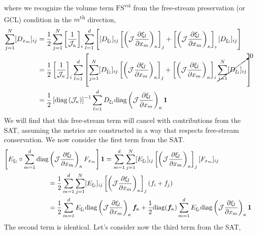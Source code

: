 \documentclass[12pt,a4paper]{article}
\newcommand{\pder}[2][]{\dfrac{\partial #1}{\partial #2}} %
\newcommand{\up}{\textsuperscript} %
\newcommand{\fn}[1]{\mathcal{#1}} %
\begin{document}
where we recognize the volume term $\text{FS}^{\text{vol}}$ from the free-stream preservation (or GCL) condition in the $m$\up{th} direction,
\begin{align*}
\sum_{j=1}^N [D_{x_m}]_{ij} &= \frac{1}{2} \sum_{j=1}^N \left[ \frac{1}{\fn{J}_\kappa} \right]_i \sum_{l=1}^d \left[ [D_{\xi_l}]_{ij} \left[ \left( \fn{J} \pder[\xi_l]{x_m} \right)_\kappa \right]_j + \left[ \left( \fn{J} \pder[\xi_l]{x_m} \right)_\kappa \right]_i  [ D_{\xi_l} ]_{ij} \right] \\
&= \frac{1}{2} \left[ \frac{1}{\fn{J}_\kappa} \right]_i \sum_{l=1}^d \left[ \sum_{j=1}^N [D_{\xi_l}]_{ij} \left[ \left( \fn{J} \pder[\xi_l]{x_m} \right)_\kappa \right]_j + \left[ \left( \fn{J} \pder[\xi_l]{x_m} \right)_\kappa \right]_i \cancelto{0}{\sum_{j=1}^N [ D_{\xi_l} ]_{ij}} \right] \\
&= \frac{1}{2}  \left[ \text{diag}\left( \fn{J}_\kappa \right) \right]^{-1} \sum_{l=1}^d  D_{\xi_l} \text{diag} \left( \fn{J} \pder[\xi_l]{x_m} \right)_\kappa \bm{1} 
\end{align*}
We will find that this free-stream term will cancel with contributions from the SAT, assuming the metrics are constructed in a way that respects free-stream conservation. We now consider the first term from the SAT.
\begin{align*}
\left[ E_{\xi_l} \circ \sum_{m=1}^d \text{diag}  \left( \fn{J} \pder[\xi_l]{x_m} \right)_{\kappa} F_{x_m}  \right] \bm{1} & = \sum_{m=1}^d \sum_{j=1}^N [E_{\xi_l}]_{ij} \left[ \left( \fn{J} \pder[\xi_l]{x_m} \right)_{\kappa} \right]_{j} [ F_{x_m} ]_{ij} \\
& \hspace{-3cm} = \frac{1}{2} \sum_{m=1}^d \sum_{j=1}^N [E_{\xi_l}]_{ij} \left[ \left( \fn{J} \pder[\xi_l]{x_m} \right)_{\kappa} \right]_{j} (f_i + f_j) \\
& \hspace{-3cm} = \frac{1}{2} \sum_{m=1}^d E_{\xi_l} \text{diag}  \left( \fn{J} \pder[\xi_l]{x_m} \right)_{\kappa} \bm{f}_\kappa + \frac{1}{2} \text{diag} (\bm{f}_\kappa) \sum_{m=1}^d E_{\xi_l} \text{diag}  \left( \fn{J} \pder[\xi_l]{x_m} \right)_{\kappa} \bm{1}
\end{align*}
The second term is identical. Let's consider now the third term from the SAT,
\end{document}
